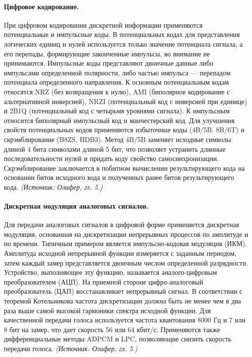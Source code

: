 \documentclass[a4paper,12pt]{article}
\begin{document}
\paragraph{Цифровое кодирование.}
При цифровом кодировании дискретной информации применяются потенциальные и импульсные коды. В потенциальных кодах для представления логических единиц и нулей используется только значение потенциала сигнала, а его перепады, формирующие законченные импульсы, во внимание не принимаются. Импульсные коды представляют двоичные данные либо импульсами определенной полярности, либо частью импульса — перепадом потенциала определенного направления. К основным потенциальным кодам относятся NRZ (без возвращения к нулю), AMI (биполярное кодирование с альтернативной инверсией), NRZI (потенциальный код с инверсией при единице) и 2B1Q (потенциальный код с четырьмя уровнями сигнала). К импульсным относится биполярный импульсный код и манчестерский код. Для улучшения свойств потенциальных кодов применяются избыточные коды (4B/5B, 8B/6T) и скрэмблирование (B8ZS, HDB3). Метод 4B/5B заменяет исходные символы длиной 4 бита символами длиной 5 бит, что позволяет устранить длинные последовательности нулей и придать коду свойство самосинхронизации. Скрэмблирование заключается в побитном вычислении результирующего кода на основании битов исходного кода и полученных ранее битов результирующего кода.
\textit{(Источник: Олифер, гл. 5.)}

\paragraph{Дискретная модуляция аналоговых сигналов.}
Для передачи аналоговых сигналов в цифровой форме применяется дискретная модуляция, основанная на дискретизации непрерывных процессов по амплитуде и по времени. Типичным примером является импульсно-кодовая модуляция (ИКМ). Амплитуда исходной непрерывной функции измеряется с заданным периодом, затем каждый замер представляется двоичным числом определенной разрядности. Устройство, выполняющее эту функцию, называется аналого-цифровым преобразователем (АЦП). На приемной стороне цифро-аналоговый преобразователь (ЦАП) восстанавливает непрерывный сигнал. В соответствии с теоремой Котельникова частота дискретизации должна быть не менее чем в два раза выше самой высокой гармоники спектра исходной функции. Для качественной передачи голоса используется частота квантования 8000 Гц и 7 или 8 бит на замер, что дает скорость 56 или 64 кбит/с. Применяются также дифференциальные методы ADPCM и LPC, позволяющие снизить скорость передачи голоса.
\textit{(Источник: Олифер, гл. 5.)}
\end{document}

